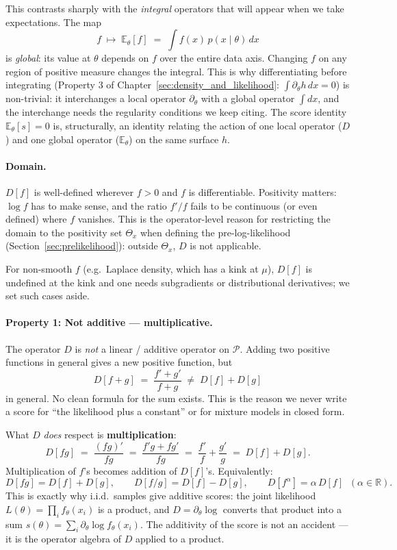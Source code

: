 \documentclass[a4paper,oneside,12pt]{extarticle}
\theoremstyle{plain}
\theoremstyle{definition}
\theoremstyle{remark}
\newcommand*{\E}{\mathbb{E}}
\begin{document}
This contrasts sharply with the \emph{integral} operators that will
appear when we take expectations.  The map
\[
  f \;\longmapsto\; \E_\theta[f]
  \;=\; \int f(x)\,p(x\mid\theta)\,dx
\]
is \emph{global}: its value at $\theta$ depends on $f$ over the entire
data axis.  Changing $f$ on any region of positive measure changes
the integral.  This is why differentiating before integrating
(Property 3 of Chapter~\ref{sec:density_and_likelihood}: $\int
\partial_\theta h\,dx = 0$) is non-trivial: it interchanges a local
operator $\partial_\theta$ with a global operator $\int dx$, and the
interchange needs the regularity conditions we keep citing.  The
score identity $\E_\theta[s] = 0$ is, structurally, an identity
relating the action of one local operator ($D$) and one global
operator ($\E_\theta$) on the same surface $h$.

\paragraph{Domain.}
$D[f]$ is well-defined wherever $f > 0$ and $f$ is differentiable.
Positivity matters: $\log f$ has to make sense, and the ratio $f'/f$
fails to be continuous (or even defined) where $f$ vanishes.  This
is the operator-level reason for restricting the domain to the
positivity set $\Theta_x$ when defining the pre-log-likelihood
(Section~\ref{sec:prelikelihood}): outside $\Theta_x$, $D$ is not
applicable.

For non-smooth $f$ (e.g.\ Laplace density, which has a kink at $\mu$),
$D[f]$ is undefined at the kink and one needs subgradients or
distributional derivatives; we set such cases aside.

\paragraph{Property 1: Not additive --- multiplicative.}
The operator $D$ is \emph{not} a linear / additive operator on
$\mathcal{P}$.  Adding two positive functions in general gives a
new positive function, but
\[
  D[f+g] \;=\; \frac{f' + g'}{f + g}
  \;\neq\; D[f] + D[g]
\]
in general.  No clean formula for the sum exists.  This is the
reason we never write a score for ``the likelihood plus a constant''
or for mixture models in closed form.

What $D$ \emph{does} respect is \textbf{multiplication}:
\[
  D[fg] \;=\; \frac{(fg)'}{fg} \;=\; \frac{f'g + fg'}{fg}
  \;=\; \frac{f'}{f} + \frac{g'}{g} \;=\; D[f] + D[g].
\]
Multiplication of $f$'s becomes addition of $D[f]$'s.  Equivalently:
\[
  D[fg] = D[f] + D[g],
  \qquad
  D[f/g] = D[f] - D[g],
  \qquad
  D[f^\alpha] = \alpha\,D[f] \;\; (\alpha\in\mathbb{R}).
\]
This is exactly why i.i.d.\ samples give additive scores: the joint
likelihood $L(\theta) = \prod_i f_\theta(x_i)$ is a product, and
$D = \partial_\theta\log$ converts that product into a sum
$s(\theta) = \sum_i \partial_\theta \log f_\theta(x_i)$.  The
additivity of the score is not an accident --- it is the operator
algebra of $D$ applied to a product.
\end{document}
